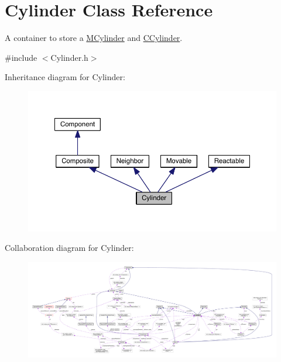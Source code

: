 \hypertarget{classCylinder}{\section{Cylinder Class Reference}
\label{classCylinder}
}


A container to store a \hyperlink{classMCylinder}{M\+Cylinder} and \hyperlink{classCCylinder}{C\+Cylinder}.  




{\ttfamily \#include $<$Cylinder.\+h$>$}



Inheritance diagram for Cylinder\+:\nopagebreak
\begin{figure}[H]
\begin{center}
\leavevmode
\includegraphics[width=350pt]{classCylinder__inherit__graph}
\end{center}
\end{figure}


Collaboration diagram for Cylinder\+:\nopagebreak
\begin{figure}[H]
\begin{center}
\leavevmode
\includegraphics[width=350pt]{classCylinder__coll__graph}
\end{center}
\end{figure}
